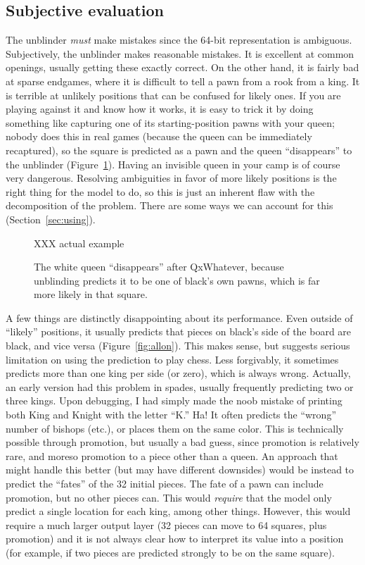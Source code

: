 \documentclass[twocolumn]{amsart}
\begin{document}
\subsection{Subjective evaluation}

The unblinder {\em must} make mistakes since the 64-bit representation
is ambiguous. Subjectively, the unblinder makes reasonable mistakes.
It is excellent at common openings, usually getting these exactly
correct. On the other hand, it is fairly bad at sparse endgames, where
it is difficult to tell a pawn from a rook from a king. It is terrible
at unlikely positions that can be confused for likely ones. If you are
playing against it and know how it works, it is easy to trick it by
doing something like capturing one of its starting-position pawns with
your queen; nobody does this in real games (because the queen can be
immediately recaptured), so the square is predicted as a pawn and the
queen ``disappears'' to the unblinder (Figure~\ref{fig:trick}). Having
an invisible queen in your camp is of course very dangerous. Resolving
ambiguities in favor of more likely positions is the right thing for
the model to do, so this is just an inherent flaw with the
decomposition of the problem. There are some ways we can account for
this (Section~\ref{sec:using}). %

\begin{figure}[ht]
XXX actual example
\caption{The white queen ``disappears'' after QxWhatever, because
  unblinding predicts it to be one of black's own pawns, which is far
  more likely in that square.} \label{fig:trick}
\end{figure}

A few things are distinctly disappointing about its performance. Even
outside of ``likely'' positions, it usually predicts that pieces on
black's side of the board are black, and vice versa
(Figure~\ref{fig:allon}). This makes sense, but suggests serious
limitation on using the prediction to play chess. Less forgivably, it
sometimes predicts more than one king per side (or zero), which is
always wrong. Actually, an early version had this problem in spades,
usually frequently predicting two or three kings. Upon debugging, I
had simply made the noob mistake of printing both King and Knight with
the letter ``K.'' Ha! It often predicts the ``wrong'' number of
bishops (etc.), or places them on the same color. This is technically
possible through promotion, but usually a bad guess, since promotion
is relatively rare, and moreso promotion to a piece other than a
queen. An approach that might handle this better (but may have
different downsides) would be instead to predict the ``fates'' of the
32 initial pieces. The fate of a pawn can include promotion, but no
other pieces can. This would {\em require} that the model only predict
a single location for each king, among other things. However, this
would require a much larger output layer (32 pieces can move to 64
squares, plus promotion) and it is not always clear how to interpret
its value into a position (for example, if two pieces are predicted
strongly to be on the same square).
\end{document}
